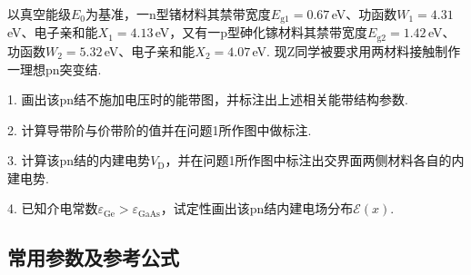 \documentclass{ctexart}
\begin{document}
以真空能级$E_0$为基准，一n型锗材料其禁带宽度$E_\text{g1}=0.67\,$eV、功函数$W_1=4.31\,$eV、电子亲和能$X_1=4.13\,$eV，又有一p型砷化镓材料其禁带宽度$E_\text{g2}=1.42\,$eV、功函数$W_2=5.32\,$eV、电子亲和能$X_2=4.07\,$eV. 现Z同学被要求用两材料接触制作一理想pn突变结.\par

1. 画出该pn结不施加电压时的能带图，并标注出上述相关能带结构参数.\par
2. 计算导带阶与价带阶的值并在问题1所作图中做标注.\par
3. 计算该pn结的内建电势$V_\text{D}$，并在问题1所作图中标注出交界面两侧材料各自的内建电势.\par
4. 已知介电常数$\varepsilon_\text{Ge}>\varepsilon_\text{GaAs}$，试定性画出该pn结内建电场分布$\mathscr{E}(x)$.\par


\newpage
\thispagestyle{empty}
\begin{center}
    \subsection*{常用参数及参考公式}
\end{center}
\end{document}
